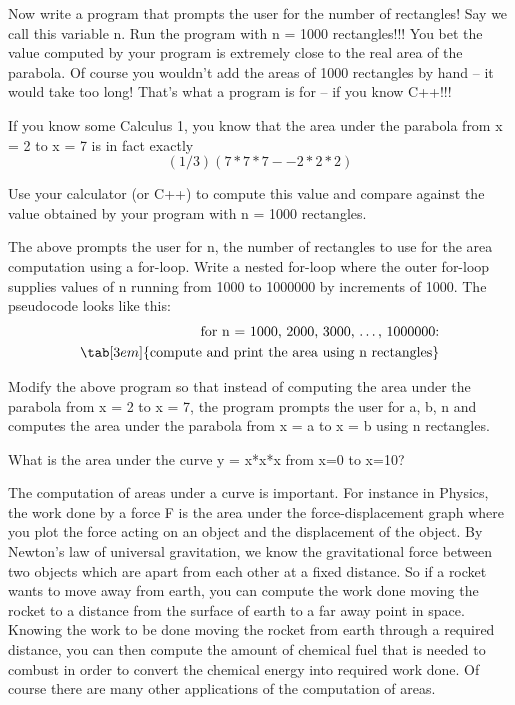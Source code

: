 Now write a program that prompts the user for the number of rectangles!
Say we call this variable n. Run the program with n = 1000 rectangles!!!
You bet the value computed by your program is extremely close to the
real area of the parabola. Of course you wouldn't add
the areas of 1000 rectangles by hand -- it would take too long!
That's what a program is for -- if you know C++!!!

\begin{ex}
If you know some Calculus 1, you know that the area
under the parabola from x = 2 to x = 7 is in fact exactly
\[(1 / 3)(7 * 7 * 7 -- 2 * 2 * 2)\]

Use your calculator (or C++) to compute this value and compare against
the value obtained by your program with n = 1000 rectangles.
\end{ex}

\begin{ex}
The above prompts the user for n, the number of
rectangles to use for the area computation using a for-loop. Write a
nested for-loop where the outer for-loop supplies values of n running
from 1000 to 1000000 by increments of 1000. The pseudocode looks like
this:
\begin{align*}
\text{for n = 1000, 2000, 3000, \ldots, 1000000:}\\
\tab[3em]{\text{compute and print the area using n rectangles}}
\end{align*}
\end{ex}

\begin{ex}
 Modify the above program so that instead of computing
the area under the parabola from x = 2 to x = 7, the program prompts the
user for a, b, n and computes the area under the parabola from x = a to
x = b using n rectangles.
\end{ex}

\begin{ex}
 What is the area under the curve y = x*x*x from x=0
to x=10?
\end{ex}

The computation of areas under a curve is important. For instance in
Physics, the work done by a force F is the area under the
force-displacement graph where you plot the force acting on an object
and the displacement of the object. By Newton's law of
universal gravitation, we know the gravitational force between two
objects which are apart from each other at a fixed distance. So if a
rocket wants to move away from earth, you can compute the work done
moving the rocket to a distance from the surface of earth to a far away
point in space. Knowing the work to be done moving the rocket from earth
through a required distance, you can then compute the amount of chemical
fuel that is needed to combust in order to convert the chemical energy
into required work done. Of course there are many other applications of
the computation of areas.

